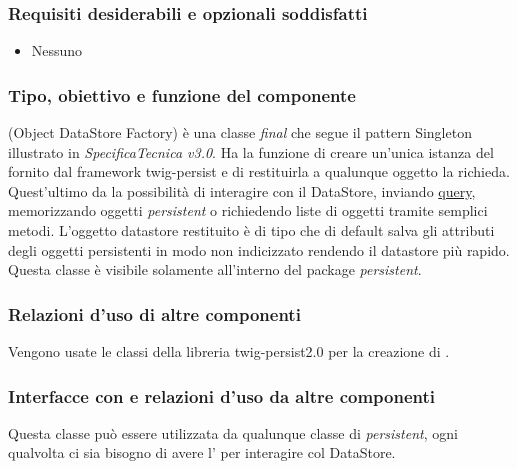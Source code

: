 \subsubsection*{Requisiti desiderabili e opzionali soddisfatti}
\begin{itemize}
    \item Nessuno
\end{itemize}
\subsubsection*{Tipo, obiettivo e funzione del componente}
 (Object DataStore Factory) \`e una classe \emph{final} che segue il
pattern Singleton illustrato in \emph{SpecificaTecnica v3.0}. Ha la funzione di creare un'unica istanza del
 fornito dal framework twig-persist e di restituirla a
qualunque oggetto la richieda. Quest'ultimo da la possibilit\`a di interagire
con il DataStore, inviando \underline{query}, memorizzando oggetti
\emph{persistent} o richiedendo liste di oggetti tramite semplici metodi.
L'oggetto datastore restituito \`e di tipo  che di
default salva gli attributi degli oggetti persistenti in modo non indicizzato
rendendo il datastore pi\`u rapido.\\ Questa classe \`e visibile solamente
all'interno del package \emph{persistent}.
\subsubsection*{Relazioni d'uso di altre componenti} Vengono usate le classi della libreria twig-persist2.0 per la creazione di .
\subsubsection*{Interfacce con e relazioni d'uso da altre componenti}
Questa classe pu\`o essere utilizzata da qualunque classe di \emph{persistent},
ogni qualvolta ci sia bisogno di avere l'  per interagire col
DataStore.
